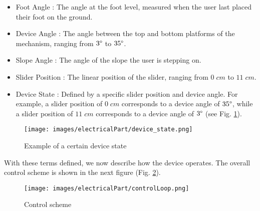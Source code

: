 \documentclass[lettersize,journal]{IEEEtran}
\begin{document}
\begin{itemize}
    \item Foot Angle : The angle at the foot level, measured when the user last placed their foot on the ground.

    \item Device Angle : The angle between the top and bottom platforms of the mechanism, ranging from $3\degree$ to $35\degree$.

    \item Slope Angle : The angle of the slope the user is stepping on.

    \item Slider Position : The linear position of the slider, ranging from $0 \;cm$ to $11 \;cm$.

    \item Device State : Defined by a specific slider position and device angle. For example, a slider position of $0\;cm$ corresponds to a device angle of $35\degree$, while a slider position of $11\;cm$ corresponds to a device angle of $3\degree$ (see Fig. \ref{fig:Devicestate}).
\end{itemize}
\begin{figure}[!ht]
\centering
\texttt{[image: images/electricalPart/device\_state.png]}
\caption{Example of a certain device state}
\label{fig:Devicestate}
\end{figure}

With these terms defined, we now describe how the device operates. The overall control scheme is shown in the next figure (Fig. \ref{Control scheme}).
\begin{figure}[!ht]
\centering
\texttt{[image: images/electricalPart/controlLoop.png]}
\caption{Control scheme}
\label{Control scheme}
\end{figure}
\end{document}
